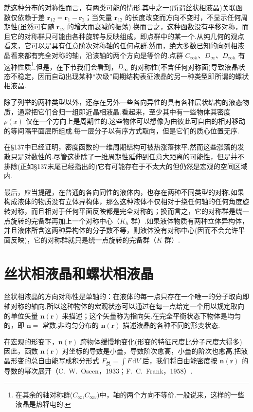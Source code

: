 就这种分布的对称性而言，有两类可能的情形.其中之一(所谓丝状相液晶)关联函数仅依赖于差 $\boldsymbol{r}_{12}=\boldsymbol{r}_1-\boldsymbol{r}_2$；当矢量 $\boldsymbol{r}_{12}$ 的长度改变而方向不变时，不显示任何周期性(虽然可有随 $\boldsymbol{r}_{12}$ 的增大而衰减的振荡).换而言之，这种函数没有平移对称，而且它的对称群只可能由各种旋转与反映组成，即点群中的某一个.从纯几何的观点看来，它可以是具有任意阶次对称轴的任何点群.然而，绝大多数已知的向列相液晶看来都有完全对称的轴，沿该轴的两个方向是等价的.点群 $C_{\infty h}$、$D_{\infty}$、$D_{\infty h}$ 有这种性质\footnote{在其余的轴对称群($C_\infty$,$C_{\infty v}$)中，轴的两个方向不等价.一般说来，这样的一些液晶是热释电的.}.但是，在下节我们会看到，$D_{\infty}$ 的对称性(不含任何对称面)导致液晶状态不稳定，因而自动出现某种“次级”周期结构表征液晶的另一种类型即所谓的螺状相液晶.

除了列举的两种类型以外，还存在另外一些各向异性的具有各种层状结构的液态物质，通常把它们合归一组即近晶相液晶.看起来，至少其中有一些物体其密度 $\rho(x)$ 仅在一个方向上是周期性的.这些物体可以想像为由彼此可自由的相对移动的等间隔平面层所组成.每一层分子以有序方式取向，但是它们的质心位置无序.

在§137中已经证明，密度函数的一维周期结构可被热涨落抹平.然而这些涨落的发散只是对数性的.尽管这排除了一维周期性延伸到任意大距离的可能性，但是并不排除(正如§137末尾已经指出的)它有可能存在于不太大的但仍然是宏观的空间区域内.

最后，应当提醒，在普通的各向同性的液体内，也存在两种不同类型的对称.如果构成液体的物质没有立体异构体，那么这种液体不仅相对于绕任何轴的任何角度旋转对称，而且相对于任何平面反映都是完全对称的；换而言之，它的对称群是绕一点旋转的完备群再加上一个对称中心（$K_h$ 群）.如果液体物质有两种立体异构体，并且液体所含这两种异构体的分子数不等，则液体没有对称中心(因而不会允许平面反映)，它的对称群就只是绕一点旋转的完备群（$K$ 群）.

\section{丝状相液晶和螺状相液晶}

丝状相液晶的方向对称性是单轴的：在液体的每一点只存在一个唯一的分子取向即轴对称的轴向.所以这种物体的宏观状态可以通过在每一点给定一个用以规定取向的单位矢量 $\boldsymbol{n}(\boldsymbol{r})$ 来描述；这个矢量称为指向矢.在完全平衡状态下物体是均匀的，即 $\boldsymbol{n}=$ 常数.非均匀分布的 $\boldsymbol{n}(\boldsymbol{r})$ 描述液晶的各种不同的形变状态.

在宏观的形变下，$\boldsymbol{n}(\boldsymbol{r})$ 跨物体缓慢地变化(形变的特征尺度比分子尺度大得多).因此，函数 $\boldsymbol{n}(\boldsymbol{r})$ 对坐标的导数是小量，导数阶次愈高，小量的阶次也愈高.把液晶形变的总自由能写成积分形式 $F_{\text{总}}=\int F\,\mathrm{d}V$ 后，我们将自由能密度按 $\boldsymbol{n}(\boldsymbol{r})$ 的导数的幂次展开（C.~W.~Oseen，1933；F.~C.~Frank，1958）.

